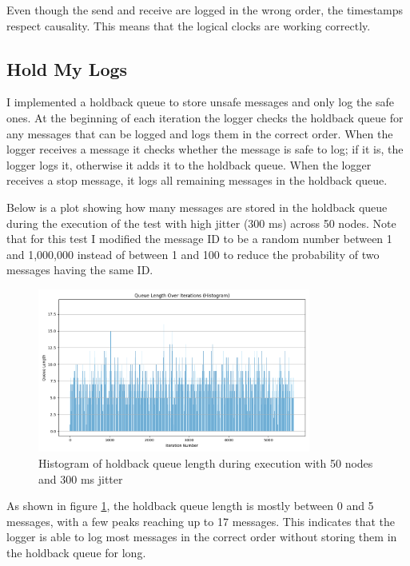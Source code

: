 \documentclass[a4paper, 11pt]{article}
\begin{document}
Even though the send and receive are logged in the wrong order, the timestamps respect causality. This means that the logical clocks are working correctly.

\subsection{Hold My Logs}

I implemented a holdback queue to store unsafe messages and only log the safe ones. At the beginning of each iteration the logger checks the holdback queue for any messages that can be logged and logs them in the correct order. When the logger receives a message it checks whether the message is safe to log; if it is, the logger logs it, otherwise it adds it to the holdback queue. When the logger receives a stop message, it logs all remaining messages in the holdback queue.

Below is a plot showing how many messages are stored in the holdback queue during the execution of the test with high jitter (300 ms) across 50 nodes. Note that for this test I modified the message ID to be a random number between 1 and 1,000,000 instead of between 1 and 100 to reduce the probability of two messages having the same ID.

\begin{figure}[H]
  \centering
  \includegraphics[width=0.8\textwidth]{imgs/test_queue_len_50_histogram.png}
  \caption{Histogram of holdback queue length during execution with 50 nodes and 300 ms jitter}
  \label{fig:queue_histogram}
\end{figure}

As shown in figure \ref{fig:queue_histogram}, the holdback queue length is mostly between 0 and 5 messages, with a few peaks reaching up to 17 messages. This indicates that the logger is able to log most messages in the correct order without storing them in the holdback queue for long.
\end{document}
